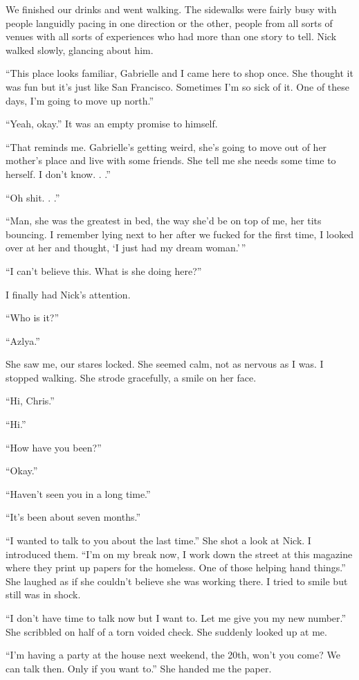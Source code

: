 We finished our drinks and went walking. The sidewalks were fairly busy
with people languidly pacing in one direction or the other, people from
all sorts of venues with all sorts of experiences who had more than one
story to tell. Nick walked slowly, glancing about him.

``This place looks familiar, Gabrielle and I came here to shop once. She
thought it was fun but it's just like San Francisco. Sometimes I'm so
sick of it. One of these days, I'm going to move up north.''

``Yeah, okay.'' It was an empty promise to himself.

``That reminds me. Gabrielle's getting weird, she's going to move out of
her mother's place and live with some friends. She tell me she needs
some time to herself. I don't know. . .''

``Oh shit. . .''

``Man, she was the greatest in bed, the way she'd be on top of me, her
tits bouncing. I remember lying next to her after we fucked for the
first time, I looked over at her and thought, `I just had my dream
woman.'\,''

``I can't believe this. What is she doing here?''

I finally had Nick's attention.

``Who is it?''

``Azlya.''

She saw me, our stares locked. She seemed calm, not as nervous as I was.
I stopped walking. She strode gracefully, a smile on her face.

``Hi, Chris.''

``Hi.''

``How have you been?''

``Okay.''

``Haven't seen you in a long time.''

``It's been about seven months.''

``I wanted to talk to you about the last time.'' She shot a look at
Nick. I introduced them. ``I'm on my break now, I work down the street
at this magazine where they print up papers for the homeless. One of
those helping hand things.'' She laughed as if she couldn't believe she
was working there. I tried to smile but still was in shock.

``I don't have time to talk now but I want to. Let me give you my new
number.'' She scribbled on half of a torn voided check. She suddenly
looked up at me.

``I'm having a party at the house next weekend, the 20th, won't you
come? We can talk then. Only if you want to.'' She handed me the paper.

